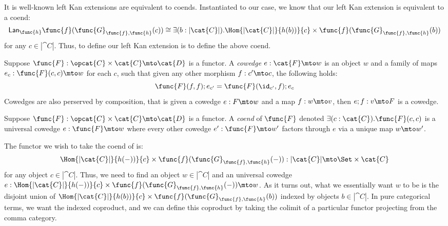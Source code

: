 It is well-known left Kan extensions are equivalent to coends.
Instantiated to our case, we know that our left Kan extension is equivalent to a coend:
\[
\begin{array}{lll}
    \Lan{\func{h}}{\func{f}(\func{G}_{\func{f},\func{h}}(c))} 
    \cong \exists(b : |\cat{C}|).\Hom{|\cat{C}|}{h(b))}{c} \times \func{f}(\func{G}_{\func{f},\func{h}}(b))\\    
\end{array}
\]
for any $c \in |\cat{C}|$. Thus, to define our left Kan extension is to define the above coend.  

\begin{definition}[Cowedge]
\label{def:cowedge}
Suppose $\func{F} : \opcat{C} \times \cat{C} \mto \cat{D}$ is a
functor. A \emph{cowedge} $e : \cat{F} \mto w$ is an object $w$ and a
family of maps $e_c : \func{F}(c,c) \mto w$ for each $c$, such that
given any other morphism $f : c' \mto c$, the following holds:
\[
    \func{F}(f,f);e_{c'} = \func{F}(\id_{c'},f);e_{c}
\]
Cowedges are also perserved by composition, that is given a cowedge $e
: F \mto w$ and a map $f : w \mto v$, then $e;f : v \mto F$ is a
cowedge.
\end{definition}

\begin{definition}[Coend]
\label{def:coend}
Suppose $\func{F} : \opcat{C} \times \cat{C} \mto \cat{D}$ is a
functor. A \emph{coend} of $\func{F}$ denoted 
$\exists(c : \cat{C}).\func{F}(c,c)$ 
is a universal cowedge $e : \func{F} \mto w$ where every other cowedge $e' :
\func{F} \mto w'$ factors through $e$ via a unique map $w \mto w'$.
\end{definition}

The functor we wish to take the coend of is:
\[
    \Hom{|\cat{C}|}{h(-))}{c} \times \func{f}(\func{G}_{\func{f},\func{h}}(-)) : |\cat{C}| \mto \Set \times \cat{C}
\]
for any object $c \in |\cat{C}|$.  Thus, we need to find an object $w
\in |\cat{C}|$ and an universal cowedge $e : \Hom{|\cat{C}|}{h(-))}{c} \times \func{f}(\func{G}_{\func{f},\func{h}}(-)) \mto w$.
As it turns out, what we essentially want $w$ to be is the disjoint
union of $\Hom{|\cat{C}|}{h(b))}{c} \times
\func{f}(\func{G}_{\func{f},\func{h}}(b))$ indexed by objects $b \in
|\cat{C}|$.  In pure categorical terms, we want the indexed coproduct,
and we can define this coproduct by taking the colimit of a particular
functor projecting from the comma category.

